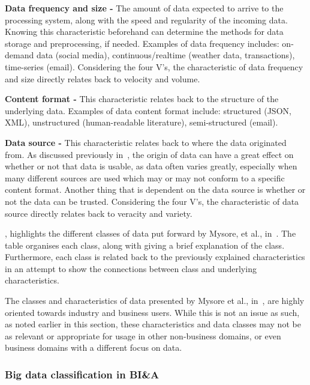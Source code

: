\documentclass[a4paper,11pt]{article}
\begin{document}
\noindent \textbf{Data frequency and size -} The amount of data expected to arrive to the processing system, along with
the speed and regularity of the incoming data. Knowing this characteristic beforehand can determine the methods for data
storage and preprocessing, if needed. Examples of data frequency includes: on-demand data (social media),
continuous/realtime (weather data, transactions), time-series (email). Considering the four V's, the characteristic of
data frequency and size directly relates back to velocity and volume.

\noindent \textbf{Content format -} This characteristic relates back to the structure of the underlying data. Examples
of data content format include: structured (JSON, XML), unstructured (human-readable literature), semi-structured
(email).

\noindent \textbf{Data source -} This characteristic relates back to where the data originated from. As discussed
previously in~, the origin of data can have a great effect on whether or not that data is usable, as
data often varies greatly, especially when many different sources are used which may or may  not conform to a specific
content format. Another thing that is dependent on the data source is whether or not the data can be trusted.
Considering the four V's, the characteristic of data source directly relates back to veracity and variety.

, highlights the different classes of data put forward by Mysore, et al.,
in~\cite{ibm_big_2013}. The table organises each class, along with giving a brief explanation of the class. Furthermore,
each class is related back to the previously explained characteristics in an attempt to show the connections between
class and underlying characteristics.

The classes and characteristics of data presented by Mysore et al., in~\cite{ibm_big_2013}, are highly oriented towards
industry and business users. While this is not an issue as such, as noted earlier in this section, these characteristics
and data classes may not be as relevant or appropriate for usage in other non-business domains, or even business domains
with a different focus on data.





\subsubsection{Big data classification in BI\&A} %
\label{ssub:big_data_BIA}
\end{document}
